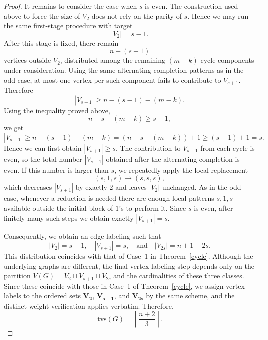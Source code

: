 \documentclass[10pt,a4paper]{amsart}
\newcommand{\tvs}{\mathrm{tvs}}
\begin{document}
\begin{proof}
It remains to consider the case when $s$ is even. The construction used above to force the size of $V_2$ does not rely on the parity of $s$. Hence we may run the same first-stage procedure with target
\[
|V_2|=s-1.
\]
After this stage is fixed, there remain
\[
n-(s-1)
\]
vertices outside $V_2$, distributed among the remaining $(m-k)$ cycle-components under consideration. Using the same alternating completion patterns as in the odd case, at most one vertex per such component fails to contribute to $V_{s+1}$. Therefore
\[
|V_{s+1}|\ge n-(s-1)-(m-k).
\]
Using the inequality proved above,
\[
n-s-(m-k)\ge s-1,
\]
we get
\[
|V_{s+1}|\ge n-(s-1)-(m-k)=(n-s-(m-k))+1\ge (s-1)+1=s.
\]
Hence we can first obtain $|V_{s+1}|\ge s$. The contribution to $V_{s+1}$ from each cycle is even, so the total number $|V_{s+1}|$ obtained after the alternating completion is even. If this number is larger than $s$, we repeatedly apply the local replacement
\[
(s,1,s)\longrightarrow (s,s,s),
\]
which decreases $|V_{s+1}|$ by exactly $2$ and leaves $|V_2|$ unchanged. As in the odd case, whenever a reduction is needed there are enough local patterns $s,1,s$ available outside the initial block of $1$'s to perform it. Since $s$ is even, after finitely many such steps we obtain exactly $|V_{s+1}|=s$.

Consequently, we obtain an edge labeling such that
\[
|V_2|=s-1,\quad |V_{s+1}|=s,\quad \text{and}\quad |V_{2s}|=n+1-2s.
\]
This distribution coincides with that of Case~1 in Theorem~\ref{cycle}. Although the underlying graphs are different, the final vertex-labeling step depends only on the partition \(V(G)=V_2\sqcup V_{s+1}\sqcup V_{2s}\) and the cardinalities of these three classes. Since these coincide with those in Case~1 of Theorem~\ref{cycle}, we assign vertex labels to the ordered sets \(\mathbf{V_2}\), \(\mathbf{V_{s+1}}\), and \(\mathbf{V_{2s}}\) by the same scheme, and the distinct-weight verification applies verbatim. Therefore,
\[
\tvs(G)=\left\lceil\frac{n+2}{3}\right\rceil.
\]

\end{proof}
\end{document}

